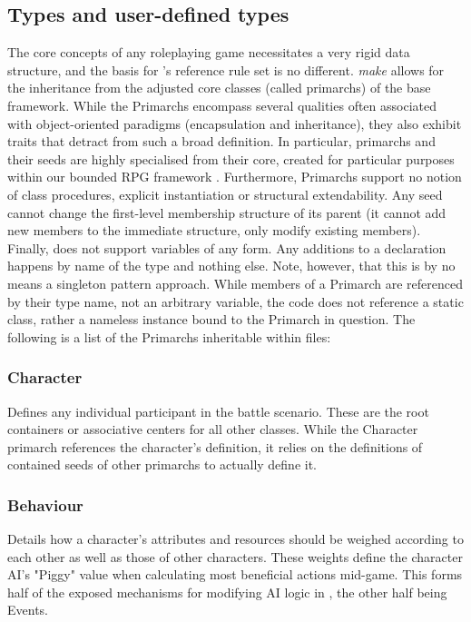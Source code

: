 \subsection{Types and user-defined types}
The core concepts of any roleplaying game necessitates a very rigid data structure, and the basis for \langname 's reference rule set is no different.
\emph{make} allows for the inheritance from the adjusted core classes (called primarchs) of the base framework. While the Primarchs encompass several qualities often associated with object-oriented paradigms (encapsulation and inheritance), they also exhibit traits that detract from such a broad definition. In particular, primarchs and their seeds  are highly specialised from their core, created for particular purposes within our bounded RPG framework . Furthermore, Primarchs support no notion of class procedures, explicit instantiation or structural extendability. Any seed cannot change the first-level membership structure of its parent (it cannot add new members to the immediate structure, only modify existing members). Finally, \langname does not support variables of any form. Any additions to a declaration happens by name of the type and nothing else. Note, however, that this is by no means a singleton pattern approach. While members of a Primarch are referenced by their type name, not an arbitrary variable, the code does not reference a static class, rather a nameless instance bound to the Primarch in question. The following is a list of the Primarchs inheritable within \langname files:

\subsubsection{Character}
Defines any individual participant in the battle scenario. These are the root containers or associative centers for all other classes. While the Character primarch references the character's definition, it relies on the definitions of contained seeds of other primarchs to actually define it.

\subsubsection{Behaviour}
Details how a character's attributes and resources should be weighed according to each other as well as those of other characters. These weights define the character AI's "Piggy" value when calculating most beneficial actions mid-game. This forms half of the exposed mechanisms for modifying AI logic in \langname, the other half being Events. 

